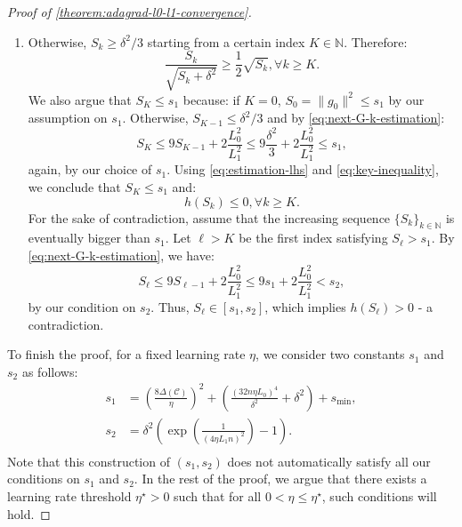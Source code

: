 \documentclass{article}
\theoremstyle{plain}
\theoremstyle{definition}
\theoremstyle{remark}
\newcommand*{\NN}{\mathbb{N}}
\begin{document}
\begin{proof}[Proof of \cref{theorem:adagrad-l0-l1-convergence}]
\begin{enumerate}[leftmargin=*]
        \item Otherwise, $S_k \geq \delta^2 / 3$ starting from a certain index $K \in \NN$. Therefore:
        \begin{equation}
            \label{eq:estimation-lhs}
            \frac{S_k}{\sqrt{S_k + \delta^2}} \geq \frac{1}{2} \sqrt{S_k}, \forall k \geq K.
        \end{equation}
        We also argue that $S_K \leq s_1$ because: if $K = 0$, $S_0 = \|g_0\|^2 \leq s_1$ by our assumption on $s_1$. Otherwise, $S_{K-1} \leq \delta^2/3$ and by \eqref{eq:next-G-k-estimation}:
        \begin{equation*}
            S_K \leq 9 S_{K - 1} + 2\frac{L_0^2}{L_1^2} \leq 9 \frac{\delta^2}{3} + 2\frac{L_0^2}{L_1^2} \leq s_1,
        \end{equation*}
        again, by our choice of $s_1$. Using \eqref{eq:estimation-lhs} and \eqref{eq:key-inequality}, we conclude that $S_K \leq s_1$ and:
        \begin{equation*}
            h(S_k) \leq 0, \forall k \geq K.
        \end{equation*}
        For the sake of contradiction, assume that the increasing sequence $\{S_k\}_{k \in \NN}$ is eventually bigger than $s_1$. Let $\ell > K$ be the first index satisfying $S_\ell > s_1$. By \eqref{eq:next-G-k-estimation}, we have:
        \begin{equation*}
            S_\ell \leq 9S_{\ell - 1} + 2\frac{L_0^2}{L_1^2} \leq 9s_1 + 2\frac{L_0^2}{L_1^2} < s_2,
        \end{equation*}
        by our condition on $s_2$. Thus, $S_\ell \in [s_1,s_2]$, which implies $h(S_\ell) > 0$ - a contradiction.
    \end{enumerate}
    To finish the proof, for a fixed learning rate $\eta$, we consider two constants $s_1$ and $s_2$ as follows:
    \begin{equation}
        \label{eq:s1-s2-construction-adadiag}
        \begin{aligned}
            s_1 &= \left(\frac{8 \Delta(\mathcal{C})}{\eta}\right)^2 + \left(\frac{(32n\eta L_0)^4}{\delta^2} + \delta^2\right) + s_{\min},\\
            s_2 &= \delta^2 \left(\exp\left(\frac{1}{(4\eta L_1 n)^2}\right) - 1\right).\\
        \end{aligned}
    \end{equation}
    Note that this construction of $(s_1,s_2)$ does not automatically satisfy all our conditions on $s_1$ and $s_2$. In the rest of the proof, we argue that there exists a learning rate threshold $\eta^\star > 0$ such that for all $0 < \eta \leq \eta^\star$, such conditions will hold. 


\end{proof}
\end{document}
